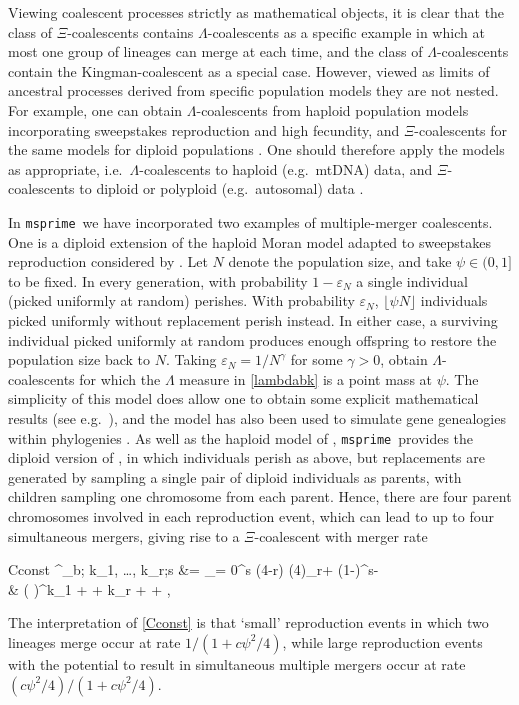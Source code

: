 \documentclass[9pt,twocolumn,twoside,lineno]{gsajnl}
\newcommand{\msprime}[0]{\texttt{msprime}}
\newcommand{\one}[1]{\ensuremath{\mathds{1}_{\left\{ #1 \right\}}}}%
\begin{document}
Viewing coalescent processes strictly as mathematical
objects, it is clear that the class of $\Xi$-coalescents contains
$\Lambda$-coalescents as a specific example in which at most
one group of lineages can merge at each time, and the class of
$\Lambda$-coalescents contain the Kingman-coalescent as a special
case.  However, viewed as limits of ancestral processes derived from
specific population models they are not nested. For example, one can
obtain $\Lambda$-coalescents from haploid population models
incorporating sweepstakes reproduction and high fecundity,
and $\Xi$-coalescents for the same models for diploid populations \citep{BBE13}.
One should therefore apply the models as appropriate, i.e.\
$\Lambda$-coalescents to haploid (e.g.\ mtDNA) data,
and $\Xi$-coalescents to diploid or polyploid (e.g.\ autosomal) data \citep{blath2016site}.


In \msprime\ we have incorporated two examples of multiple-merger coalescents.
One is a diploid extension \citep{BBE13} of the haploid Moran model adapted
to sweepstakes reproduction considered by \cite{EW06}.
Let $N$ denote the population size, and take $\psi \in (0,1]$ to be fixed.
In every generation, with probability $1-\varepsilon_N$ a single individual
(picked uniformly at random) perishes.
With probability $\varepsilon_N$, $\lfloor \psi N \rfloor$ individuals picked uniformly
without replacement perish instead.
In either case, a surviving individual picked uniformly at random produces enough offspring
to restore the population size back to $N$.  Taking $\varepsilon_N =
1/N^\gamma$ for some $\gamma > 0$, \cite{EW06} obtain $\Lambda$-coalescents
for which the $\Lambda$ measure in \eqref{lambdabk} is a
point mass at $\psi$.  The simplicity of this model does allow one to obtain
some explicit mathematical results (see e.g.\
\cite{Der2012, EF2018,Freund2020,Matuszewski2017}), and the model has also been
used to simulate gene genealogies within phylogenies \citep{zhu2015hybrid}.
As well as the haploid model of \cite{EW06}, \msprime\ provides the diploid version
of \cite{BBE13}, in which individuals perish as above, but replacements are
generated by sampling a single pair of diploid individuals as parents, with
children sampling one chromosome from each parent.
Hence, there are four parent chromosomes involved in each reproduction event, which can lead to
up to four simultaneous mergers, giving rise to a $\Xi$-coalescent with merger rate
\begin{esplit}{Cconst}
\lambda^{\text{Dirac}}_{b; k_1, \ldots, k_r;s } &=
    \frac{4}{ \psi^2}\sum_{\ell = 0}^{s \wedge (4-r)} 
    (4)_{r+\ell} (1-\psi)^{s-\ell } \\
    & \times \left( \frac{\psi}{4} \right)^{k_1 + \cdots + k_r + \ell} + \frac{\one{r=1, k_1 = 2}}{1 + c \psi^2 / 4},
\end{esplit}
The interpretation of \eqref{Cconst} is that `small' reproduction events in which
two lineages merge occur at rate $1/(1 + c\psi^2/4)$, while large reproduction events
with the potential to result in simultaneous multiple mergers occur at rate $(c\psi^2/4) / (1 + c\psi^2/4)$.
\end{document}
